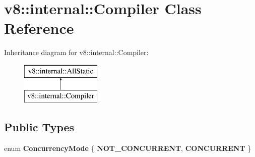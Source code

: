 \hypertarget{classv8_1_1internal_1_1_compiler}{}\section{v8\+:\+:internal\+:\+:Compiler Class Reference}
\label{classv8_1_1internal_1_1_compiler}
Inheritance diagram for v8\+:\+:internal\+:\+:Compiler\+:\begin{figure}[H]
\begin{center}
\leavevmode
\includegraphics[height=2.000000cm]{classv8_1_1internal_1_1_compiler}
\end{center}
\end{figure}
\subsection*{Public Types}
\begin{DoxyCompactItemize}
\item 
\hypertarget{classv8_1_1internal_1_1_compiler_a72baa3ba6b839cadb501c8bdf76ad7b8}{}enum {\bfseries Concurrency\+Mode} \{ {\bfseries N\+O\+T\+\_\+\+C\+O\+N\+C\+U\+R\+R\+E\+N\+T}, 
{\bfseries C\+O\+N\+C\+U\+R\+R\+E\+N\+T}
 \}\label{classv8_1_1internal_1_1_compiler_a72baa3ba6b839cadb501c8bdf76ad7b8}

\end{DoxyCompactItemize}
